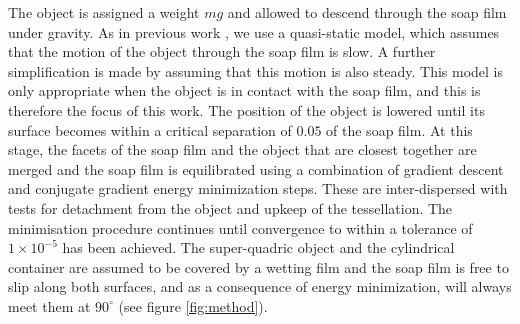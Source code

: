 \documentclass[preprint]{revtex4-1}
\begin{document}
The object is assigned a weight $mg$ and allowed to descend through the soap film under gravity. As in previous work \cite{Davies12}, we use a quasi-static model, which assumes that the motion of the object through the soap film is slow. A further simplification is made by assuming that this motion is also steady. This model is only appropriate when the object is in contact with the soap film, and this is therefore the focus of this work. The position of the object is lowered until its surface becomes within a critical separation of $0.05$ of the soap film. At this stage, the facets of the soap film and the object that are closest together are merged and the soap film is equilibrated using a combination of gradient descent and conjugate gradient energy minimization steps. These are inter-dispersed with tests for detachment from the object and upkeep of the tessellation. The minimisation procedure continues until convergence to within a tolerance of $1\times 10^{-5}$ has been achieved. The super-quadric object and the cylindrical container are assumed to be covered by a wetting film and the soap film is free to slip along both surfaces, and as a consequence of energy minimization, will always meet them at $90^\circ$ (see figure \ref{fig:method}). 
\end{document}
